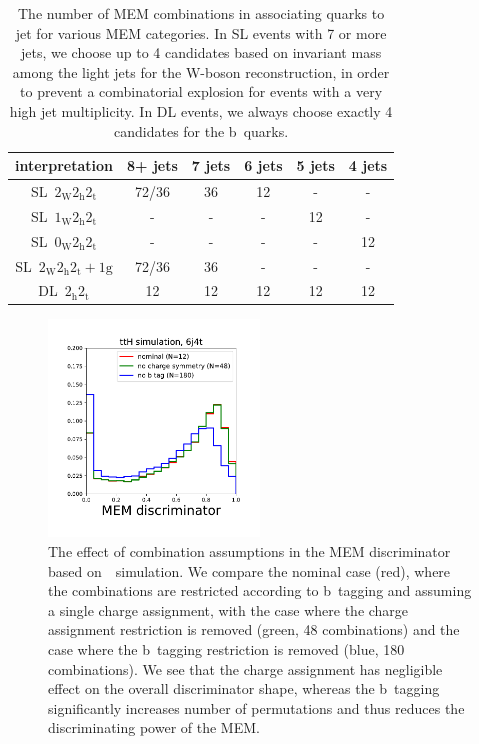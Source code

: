 \begin{table}[h!]
\begin{center}
\begin{tabular}{c|ccccc}
\hline
interpretation& 8+ jets & 7 jets & 6 jets & 5 jets & 4 jets \\
\hline
SL~$2_{\mathrm{W}} 2_{\mathrm{h}} 2_{\mathrm{t}}$ & 72/36 & 36 & 12 & - & - \\
SL~$1_{\mathrm{W}} 2_{\mathrm{h}} 2_{\mathrm{t}}$ & - & - & - & 12 & -\\
SL~$0_{\mathrm{W}} 2_{\mathrm{h}} 2_{\mathrm{t}}$ & - & - & - & - & 12 \\
SL~$2_{\mathrm{W}} 2_{\mathrm{h}} 2_{\mathrm{t}}+1\mathrm{g}$ & 72/36 & 36 & - & - & - \\
\hline
DL~$2_{\mathrm{h}} 2_{\mathrm{t}}$ & 12 & 12 & 12 & 12 & 12 \\
\hline
\hline
\end{tabular}
\caption[The number of MEM combinations in different categories]{The number of MEM combinations in associating quarks to jet for various MEM categories. In SL events with 7 or more jets, we choose up to 4 candidates based on invariant mass among the light jets for the W-boson reconstruction, in order to prevent a combinatorial explosion for events with a very high jet multiplicity. In DL events, we always choose exactly 4 candidates for the b~quarks.}
\label{tab:category_combinations}
\end{center}
\end{table}

\begin{figure}
\begin{centering}
\includegraphics[width=0.5\textwidth]{figures/mem/mem_assumptions.pdf}
\caption[The effect of combinations assumptions in the MEM]{The effect of combination assumptions in the MEM discriminator based on~\ttHbb~simulation. We compare the nominal case (red), where the combinations are restricted according to b~tagging and assuming a single charge assignment, with the case where the charge assignment restriction is removed (green, 48 combinations) and the case where the b~tagging restriction is removed (blue, 180 combinations). We see that the charge assignment has negligible effect on the overall discriminator shape, whereas the b~tagging significantly increases number of permutations and thus reduces the discriminating power of the MEM.}
\label{fig:mem_assumptions}
\end{centering}
\end{figure}

